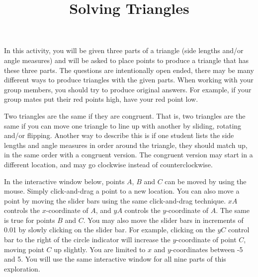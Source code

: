 \documentclass[number]{ximera}
\title{Solving Triangles}
\begin{document}
\begin{abstract}
\end{abstract}
\maketitle



In this activity, you will be given three parts of a triangle (side lengths and/or angle measures) and will be asked to place points to produce a triangle that has these three parts. The questions are intentionally open ended, there may be many different ways to produce triangles with the given parts. When working with your group members, you should try to produce original answers. For example, if your group mates put their red points high, have your red point low.

\bigskip

Two triangles are the same if they are congruent. That is, two triangles are the same if you can move one triangle to line up with another by sliding, rotating and/or flipping. Another way to describe this is if one student lists the side lengths and angle measures in order around the triangle, they should match up, in the same order with a congruent version. The congruent version may start in a different location, and may go clockwise instead of counterclockwise.

In the interactive window below, points $A$, $B$ and $C$ can be moved by using the mouse. Simply click-and-drag a point to a new location. You can also move a point by moving the slider bars using the same click-and-drag technique. $xA$ controls the $x$-coordinate of $A$, and $yA$ controls the $y$-coordinate of $A$. The same is true for points $B$ and $C$. You may also move the slider bars in increments of 0.01 by slowly clicking on the slider bar. For example, clicking on the $yC$ control bar to the right of the circle indicator will increase the $y$-coordinate of point $C$, moving point $C$ up slightly. You are limited to $x$ and $y$-coordinates between -5 and 5. You will use the same interactive window for all nine parts of this exploration.

\end{document}
